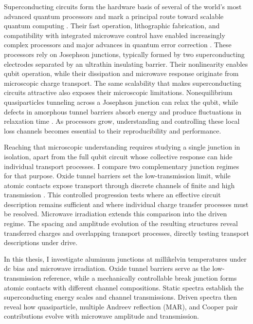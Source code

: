     Superconducting circuits form the hardware basis of several of the world's most advanced quantum processors and mark a principal route toward scalable quantum computing \cite{devoret_superconducting_2013,kjaergaard_superconducting_2020,arute_quantum_2019}. Their fast operation, lithographic fabrication, and compatibility with integrated microwave control have enabled increasingly complex processors and major advances in quantum error correction \cite{google_quantum_ai_error_2025}. These processors rely on Josephson junctions, typically formed by two superconducting electrodes separated by an ultrathin insulating barrier. Their nonlinearity enables qubit operation, while their dissipation and microwave response originate from microscopic charge transport. The same scalability that makes superconducting circuits attractive also exposes their microscopic limitations. Nonequilibrium quasiparticles tunneling across a Josephson junction can relax the qubit, while defects in amorphous tunnel barriers absorb energy and produce fluctuations in relaxation time \cite{catelani_relaxation_2011,klimov_fluctuations_2018,bilmes_probing_2022}. As processors grow, understanding and controlling these local loss channels becomes essential to their reproducibility and performance.

    \newpage
    Reaching that microscopic understanding requires studying a single junction in isolation, apart from the full qubit circuit whose collective response can hide individual transport processes. I compare two complementary junction regimes for that purpose. Oxide tunnel barriers set the low-transmission limit, while atomic contacts expose transport through discrete channels of finite and high transmission \cite{scheer_conduction_1997,agrait_quantum_2003}. This controlled progression tests where an effective circuit description remains sufficient and where individual charge transfer processes must be resolved. Microwave irradiation extends this comparison into the driven regime. The spacing and amplitude evolution of the resulting structures reveal transferred charges and overlapping transport processes, directly testing transport descriptions under drive.

    In this thesis, I investigate aluminum junctions at millikelvin temperatures under dc bias and microwave irradiation. Oxide tunnel barriers serve as the low-transmission reference, while a mechanically controllable break junction forms atomic contacts with different channel compositions. Static spectra establish the superconducting energy scales and channel transmissions. Driven spectra then reveal how quasiparticle, multiple Andreev reflection (MAR), and Cooper pair contributions evolve with microwave amplitude and transmission.

